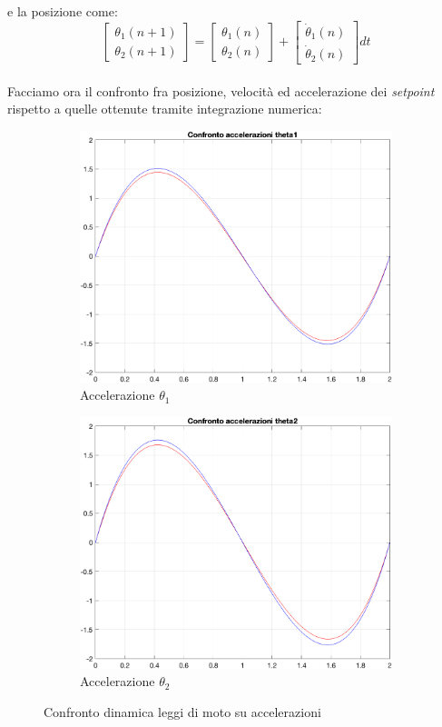 e la posizione come:
\begin{equation*}
	\begin{bmatrix}
		{\theta}_1 (n+1) \\ {\theta}_2(n+1)
	\end{bmatrix} = \begin{bmatrix}
		{\theta}_1 (n) \\ {\theta}_2(n)
	\end{bmatrix} + \begin{bmatrix}
		\dot{\theta}_1 (n) \\ \dot{\theta}_2(n)
	\end{bmatrix}dt
\end{equation*}
\\Facciamo ora il confronto fra posizione, velocità ed accelerazione dei \textit{setpoint} rispetto a quelle ottenute tramite integrazione numerica:
\begin{figure}[!ht]
\begin{subfigure}{.45\textwidth}
  \centering
  \includegraphics[width=.78\linewidth]{Immagini/Dinamica/confracct1.png}  
  \caption{Accelerazione $\theta_1$}
  \label{fig:sub-first}
\end{subfigure}
\begin{subfigure}{.45\textwidth}
  \centering
  \includegraphics[width=.78\linewidth]{Immagini/Dinamica/confracct2.png}  
  \caption{Accelerazione $\theta_2$}
  \label{fig:sub-second}
\end{subfigure}
\caption{Confronto dinamica leggi di moto su accelerazioni}
\end{figure}
